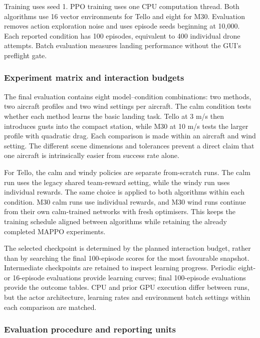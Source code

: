Training uses seed 1. PPO training uses one CPU computation thread. Both algorithms use 16 vector environments for Tello and eight for M30. Evaluation removes action exploration noise and uses episode seeds beginning at 10,000. Each reported condition has 100 episodes, equivalent to 400 individual drone attempts. Batch evaluation measures landing performance without the GUI's preflight gate.

\hypertarget{experiment-matrix-and-interaction-budgets}{%
\subsubsection{Experiment matrix and interaction budgets}\label{experiment-matrix-and-interaction-budgets}}

The final evaluation contains eight model--condition combinations: two methods, two aircraft profiles and two wind settings per aircraft. The calm condition tests whether each method learns the basic landing task. Tello at 3 m/s then introduces gusts into the compact station, while M30 at 10 m/s tests the larger profile with quadratic drag. Each comparison is made within an aircraft and wind setting. The different scene dimensions and tolerances prevent a direct claim that one aircraft is intrinsically easier from success rate alone.

For Tello, the calm and windy policies are separate from-scratch runs. The calm run uses the legacy shared team-reward setting, while the windy run uses individual rewards. The same choice is applied to both algorithms within each condition. M30 calm runs use individual rewards, and M30 wind runs continue from their own calm-trained networks with fresh optimisers. This keeps the training schedule aligned between algorithms while retaining the already completed MAPPO experiments.

The selected checkpoint is determined by the planned interaction budget, rather than by searching the final 100-episode scores for the most favourable snapshot. Intermediate checkpoints are retained to inspect learning progress. Periodic eight- or 16-episode evaluations provide learning curves; final 100-episode evaluations provide the outcome tables. CPU and prior GPU execution differ between runs, but the actor architecture, learning rates and environment batch settings within each comparison are matched.

\hypertarget{evaluation-procedure-and-reporting-units}{%
\subsubsection{Evaluation procedure and reporting units}\label{evaluation-procedure-and-reporting-units}}

